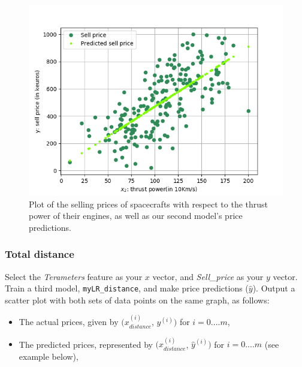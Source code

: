 \documentclass{42-en}
\begin{document}
\begin{figure}[!h]
  \centering
  \includegraphics[scale=0.6]{assets/ex07_price_vs_thrust_part1.png}
  \caption{Plot of the selling prices of spacecrafts with respect to the thrust power of their engines, as well as our second model's price predictions.}
\end{figure}
\newpage
\subsubsection*{Total distance}
Select the \textit{Terameters} feature as your $x$ vector, and \textit{Sell\_price} as your $y$ vector.
Train a third model, \texttt{myLR\_distance}, and make price predictions ($\hat{y}$).
Output a scatter plot with both sets of data points on the same graph, as follows:
\begin{itemize}
  \item The actual prices, given by $(x_{distance}^{(i)}$, $y^{(i)})$  for $i=0....m$, 
  \item The predicted prices, represented by  $(x_{distance}^{(i)}$, $\hat{y}^{(i)})$  for $i=0....m$  (see example below),
\end{itemize}
\end{document}
